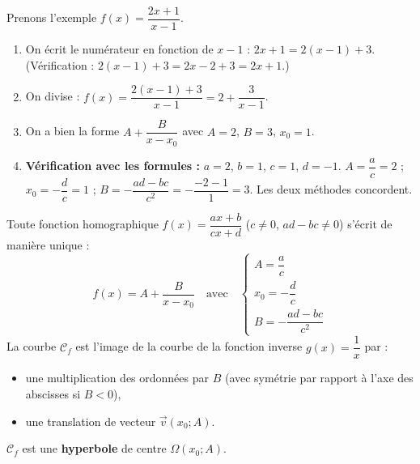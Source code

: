 \documentclass[11pt]{article}
\begin{document}
\begin{experience}
Prenons l'exemple $f(x) = \dfrac{2x+1}{x-1}$.
\begin{enumerate}
    \item On écrit le numérateur en fonction de $x-1$ : $2x+1 = 2(x-1) + 3$. (Vérification : $2(x-1)+3 = 2x - 2 + 3 = 2x+1$.)
    \item On divise : $f(x) = \dfrac{2(x-1)+3}{x-1} = 2 + \dfrac{3}{x-1}$.
    \item On a bien la forme $A + \dfrac{B}{x-x_0}$ avec $A=2$, $B=3$, $x_0=1$.
    \item \textbf{Vérification avec les formules :} $a=2$, $b=1$, $c=1$, $d=-1$.
    $A = \dfrac{a}{c} = 2$ ; $x_0 = -\dfrac{d}{c} = 1$ ; $B = -\dfrac{ad-bc}{c^2} = -\dfrac{-2-1}{1} = 3$. Les deux méthodes concordent.
\end{enumerate}
\end{experience}

\begin{propriete}
Toute fonction homographique $f(x) = \dfrac{ax+b}{cx+d}$ ($c \neq 0$, $ad-bc \neq 0$) s'écrit de manière unique :
\[
f(x) = A + \frac{B}{x - x_0} \quad \text{avec} \quad
\begin{cases}
A = \dfrac{a}{c} \\[0.8em]
x_0 = -\dfrac{d}{c} \\[0.8em]
B = -\dfrac{ad-bc}{c^2}
\end{cases}
\]
La courbe $\mathcal{C}_f$ est l'image de la courbe de la fonction inverse $g(x) = \dfrac{1}{x}$ par :
\begin{itemize}
    \item une multiplication des ordonnées par $B$ (avec symétrie par rapport à l'axe des abscisses si $B<0$),
    \item une translation de vecteur $\vec{v}(x_0 ; A)$.
\end{itemize}
$\mathcal{C}_f$ est une \textbf{hyperbole} de centre $\Omega(x_0 ; A)$.
\end{propriete}
\end{document}
